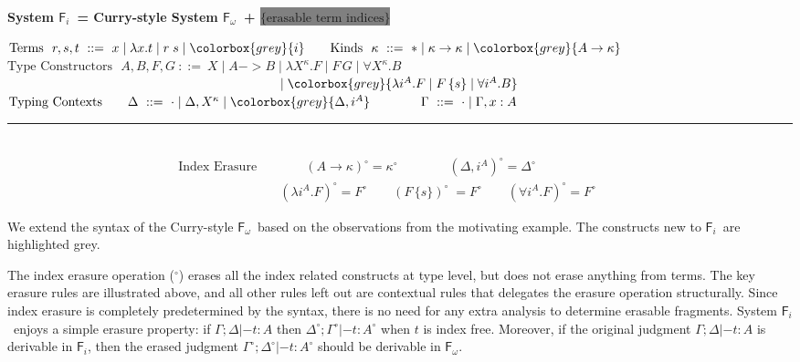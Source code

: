 \documentclass{article}
\newcommand{\Fi}{\ensuremath{\mathsf{F}_i}}
\newcommand{\Fw}{\ensuremath{\mathsf{F}_\omega}}
\newcommand{\newFi}[1]{\colorbox{grey}{\ensuremath{#1}}}
\begin{document}
\begin{center}
\textbf{
 System \Fi ~= Curry-style System \Fw\ + \newFi{\text{\{erasable term indices\}}}}
 \vspace*{-7pt}
\end{center}
\begin{framed}\vspace{-6pt}\noindent
$
\text{Terms}~~ r,s,t ~ ::= ~ x \mid \lambda x.t \mid r\;s \mid \newFi{i}
\qquad
\text{Kinds}~~ \kappa ~ ::= ~ *
                                \mid \kappa -> \kappa
                                \mid \newFi{A -> \kappa}$ \vspace*{2pt} \\
$
\text{Type Constructors}~~~
        A,B,F,G               ~ ::= ~ X
                                \mid A -> B
                                \mid \lambda X^\kappa.F
                                \mid F\,G
                                \mid \forall X^\kappa . B$\\
$~\qquad\qquad\qquad\qquad\qquad\qquad\qquad\qquad\qquad\qquad\quad
\mid \newFi{\lambda i^A.F
                                \mid F\,\{s\}
                                \mid \forall i^A . B}$ \\
$\text{Typing Contexts}
\qquad \Delta                ~ ::= ~ \cdot
                                \mid \Delta, X^\kappa
                                \mid \newFi{\Delta, i^A}
\qquad\qquad \Gamma                ~ ::= ~ \cdot
                                \mid \Gamma, x : A 
$\vspace*{3pt}
\hrule ~ \\ \vspace*{-20pt}
\begin{align*}
 \!\!\!\!\!\!\!\!\text{Index Erasure}\quad
& \qquad (A\to\kappa)^{\circ}=\kappa^{\circ} \qquad \qquad
(\Delta,i^A)^\circ = \Delta^\circ
\\
& (\lambda i^{A}.F)^{\circ}=F^{\circ} \qquad
(F\,\{s\})^{\circ}\;=F^{\circ} \qquad
(\forall i^{A}.F)^{\circ}=F^{\circ} \qquad
\end{align*}\vspace*{-25pt}
\end{framed}\vspace*{-5pt}
We extend the syntax of the Curry-style \Fw\ based on the observations from
the motivating example. The constructs new to \Fi\ are highlighted grey.

The index erasure operation ($^\circ$) erases all the index related constructs
at type level, but does not erase anything from terms. The key erasure rules are
illustrated above, and all other rules left out are contextual rules that
delegates the erasure operation structurally. Since index erasure is completely
predetermined by the syntax, there is no need for any extra analysis
to determine erasable fragments. System \Fi\ enjoys a simple erasure property:
if $\Gamma;\Delta|- t:A$ then $\Delta^\circ;\Gamma^\circ|- t:A^\circ$
when $t$ is index free.
Moreover, if the original judgment $\Gamma;\Delta|- t:A$ is derivable in \Fi,
then the erased judgment $\Gamma^\circ;\Delta^\circ|- t:A^\circ$ should be
derivable in \Fw.
\end{document}
